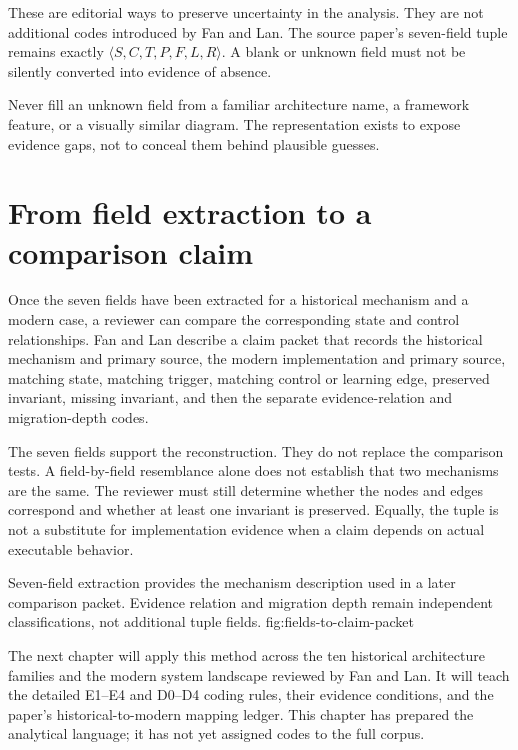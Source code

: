 These are editorial ways to preserve uncertainty in the analysis. They are not additional codes introduced by Fan and Lan. The source paper's seven-field tuple remains exactly \(\langle S,C,T,P,F,L,R\rangle\). A blank or unknown field must not be silently converted into evidence of absence.

\begin{warningbox}
Never fill an unknown field from a familiar architecture name, a framework feature, or a visually similar diagram. The representation exists to expose evidence gaps, not to conceal them behind plausible guesses.
\end{warningbox}

\section{From field extraction to a comparison claim}
\label{sec:fields-to-claim-packet}

Once the seven fields have been extracted for a historical mechanism and a modern case, a reviewer can compare the corresponding state and control relationships. Fan and Lan describe a claim packet that records the historical mechanism and primary source, the modern implementation and primary source, matching state, matching trigger, matching control or learning edge, preserved invariant, missing invariant, and then the separate evidence-relation and migration-depth codes.

The seven fields support the reconstruction. They do not replace the comparison tests. A field-by-field resemblance alone does not establish that two mechanisms are the same. The reviewer must still determine whether the nodes and edges correspond and whether at least one invariant is preserved. Equally, the tuple is not a substitute for implementation evidence when a claim depends on actual executable behavior.

  {Seven-field extraction provides the mechanism description used in a later comparison packet. Evidence relation and migration depth remain independent classifications, not additional tuple fields.}
  {fig:fields-to-claim-packet}

The next chapter will apply this method across the ten historical architecture families and the modern system landscape reviewed by Fan and Lan. It will teach the detailed E1--E4 and D0--D4 coding rules, their evidence conditions, and the paper's historical-to-modern mapping ledger. This chapter has prepared the analytical language; it has not yet assigned codes to the full corpus.

